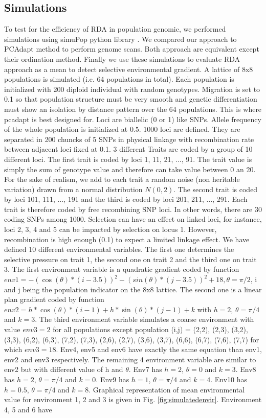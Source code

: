 \documentclass[nogrid]{MBE}%
\begin{document}
\subsection{Simulations}

To test for the efficiency of RDA in population genomic, we performed simulations using simuPop python library \citep{Peng2005}. We compared our approach to PCAdapt method to perform genome scans. Both approach are equivalent except their ordination method. Finally we use these simulations to evaluate RDA approach as a mean to detect selective environmental gradient.
	A lattice of 8x8 populations is simulated (i.e. 64 populations in total). Each population is initialized with 200 diploid individual with random genotypes. Migration is set to 0.1 so that population structure must be very smooth and genetic differentiation must show an isolation by distance pattern over the 64 populations. This is where pcadapt is best designed for. Loci are biallelic (0 or 1) like SNPs. Allele frequency of the whole population is initialized at 0.5. 1000 loci are defined. They are separated in 200 chuncks of 5 SNPs in physical linkage with recombination rate between adjacent loci fixed at 0.1. 3 different Traits are coded by a group of 10 different loci. The first trait is coded by loci 1, 11, 21, ..., 91. The trait value is simply the sum of genotype value and therefore can take value between 0 an 20. For the sake of realism, we add to each trait a random noise (non heritable variation) drawn from a normal distribution $N(0,2)$. The second trait is coded by loci 101, 111, ..., 191 and the third is coded by loci 201, 211, ..., 291. Each trait is therefore coded by free recombining SNP loci. In other words, there are 30 coding SNPs among 1000. Selection can have an effect on linked loci, for instance, loci 2, 3, 4 and 5 can be impacted by selection on locus 1. However, recombination is high enough (0.1) to expect a limited linkage effect. We have defined 10 different environmental variables. The first one determines the selective pressure on trait 1, the second one on trait 2 and the third one on trait 3. The first environment variable is a quadratic gradient coded by function  $env1 = -(\cos(\theta)*(i-3.5))^2 -(sin(\theta)*(j-3.5))^2 + 18, \theta = \pi/2$, i and j being the population indicator on the 8x8 lattice. The second one is a linear plan gradient coded by function $env2 = h*\cos(\theta)*(i-1) + h*\sin(\theta)*(j-1) + k$ with $h=2$, $\theta = \pi/4$ and $k=3$. The third environment variable simulates a coarse environment with value $env3 = 2$ for all populations except population (i,j) = {(2,2), (2,3), (3,2), (3,3), (6,2), (6,3), (7,2), (7,3), (2,6), (2,7), (3,6), (3,7), (6,6), (6,7), (7,6), (7,7)} for which $env3 = 18$. Env4, env5 and env6 have exactly the same equation than env1, env2 and env3 respectively. The remaining 4 environment variable are similar to env2 but with different value of h and $\theta$. Env7 has $h=2$, $\theta = 0$ and $k=3$. Env8 has $h=2$, $\theta = \pi/4$ and $k=0$. Env9 has $h=1$, $\theta = \pi/4$ and $k=4$. Env10 has $h=0.5$, $\theta = \pi/4$ and $k=8$. Graphical representation of mean environmental value for environment 1, 2 and 3 is given in Fig. \ref{fig:simulatedenvir}. Environment 4, 5 and 6 have 
\end{document}
